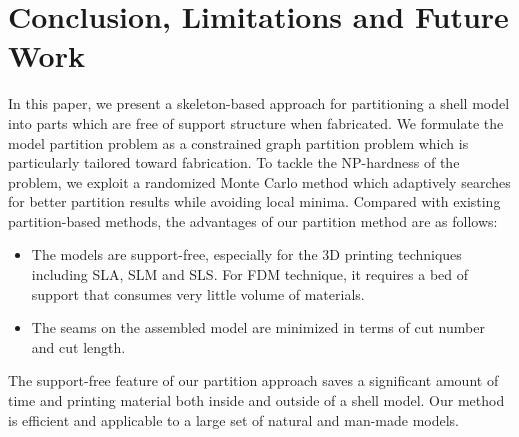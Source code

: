 \section{Conclusion, Limitations and Future Work}

In this paper, we present a skeleton-based approach for partitioning a shell model into parts which are free of support structure when fabricated. We formulate the model partition problem as a constrained graph partition problem which is particularly tailored toward fabrication. To tackle the NP-hardness of the problem, we exploit a randomized Monte Carlo method which adaptively searches for better partition results while avoiding local minima. Compared with existing partition-based methods, the advantages of our partition method are as follows:

\begin{itemize}
 \item The models are support-free, especially for the 3D printing techniques including SLA, SLM and SLS. For FDM technique, it requires a bed of support that consumes very little volume of materials.
\item The seams on the assembled model are minimized in terms of cut number and cut length.
\end{itemize}

The support-free feature of our partition approach saves a significant amount of time and printing material both inside and outside of a shell model. Our method is efficient and applicable to a large set of natural and man-made models.


